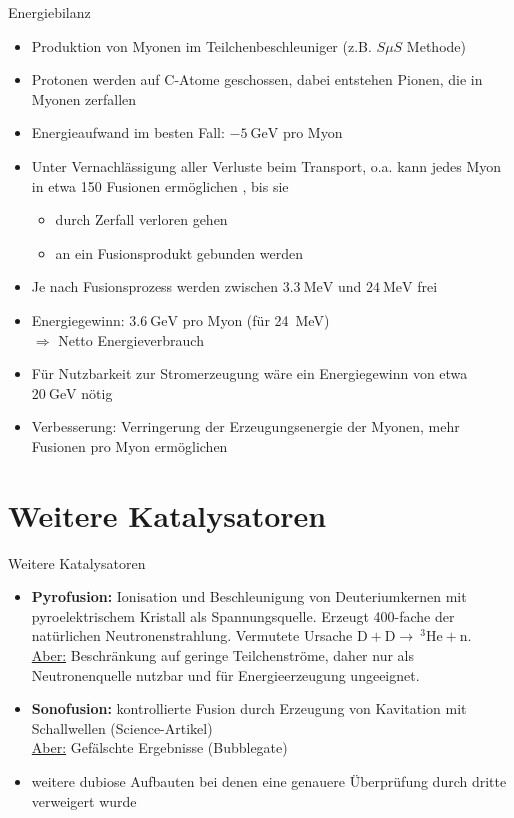 \begin{frame}{Energiebilanz}
    \begin{itemize}
        \item<+-> Produktion von Myonen im Teilchenbeschleuniger (z.B. $S\mu S$ Methode)
        \item<+-> Protonen werden auf C-Atome geschossen, dabei entstehen Pionen, die in Myonen zerfallen
        \item<+-> Energieaufwand im besten Fall: $\SI{-5}{\giga\eV}$ pro Myon \cite[S.93]{Naga03}
        \item<+-> Unter Vernachlässigung aller Verluste beim Transport, o.a. kann jedes Myon in etwa 150 Fusionen ermöglichen \cite[S.97]{Naga03}, bis sie
        \begin{itemize}
            \item durch Zerfall verloren gehen
            \item an ein Fusionsprodukt gebunden werden
        \end{itemize}
        \item<+-> Je nach Fusionsprozess werden zwischen $\SI{3.3}{\mega\eV}$ und $\SI{24}{\mega\eV}$ frei
        \item<+-> Energiegewinn: $\SI{3.6}{\giga\eV}$ pro Myon (für \SI{24}{\mega\eV}) \\ $\Rightarrow$ Netto Energieverbrauch
        \item<+-> Für Nutzbarkeit zur Stromerzeugung wäre ein Energiegewinn von etwa $\SI{20}{\giga\eV}$ nötig
        \item<+-> Verbesserung: Verringerung der Erzeugungsenergie der Myonen, mehr Fusionen pro Myon ermöglichen
    \end{itemize}
\end{frame}

\section{Weitere Katalysatoren}

\begin{frame}{Weitere Katalysatoren}
    \begin{itemize}
        \item<+-> \textbf{Pyrofusion:} Ionisation und Beschleunigung von Deuteriumkernen mit pyroelektrischem Kristall als Spannungsquelle. Erzeugt 400-fache der natürlichen Neutronenstrahlung. Vermutete Ursache $\mathrm{D + D} \to \ ^3\mathrm{He} + \mathrm{n}$. \\
        \underline{Aber:} Beschränkung auf geringe Teilchenströme, daher nur als Neutronenquelle nutzbar und für Energieerzeugung ungeeignet. \cite{wiki:ColdFuison}
        \item<+-> \textbf{Sonofusion:} kontrollierte Fusion durch Erzeugung von Kavitation mit Schallwellen (Science-Artikel) \\
        \underline{Aber:} Gefälschte Ergebnisse (Bubblegate) \cite{FAZ}
        \item<+-> weitere dubiose Aufbauten bei denen eine genauere Überprüfung durch dritte verweigert wurde
    \end{itemize}
\end{frame}